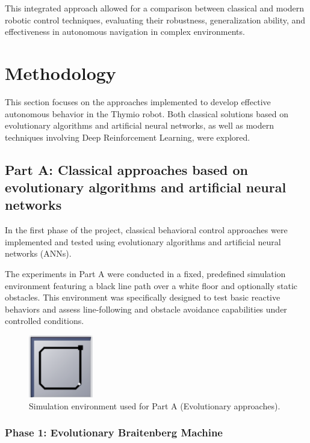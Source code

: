 \documentclass[final,5p,times,twocolumn,authoryear]{elsarticle}
\begin{document}
This integrated approach allowed for a comparison between classical and modern robotic control techniques, evaluating their robustness, generalization ability, and effectiveness in autonomous navigation in complex environments.

\section{Methodology}

This section focuses on the approaches implemented to develop effective autonomous behavior in the Thymio robot. Both classical solutions based on evolutionary algorithms and artificial neural networks, as well as modern techniques involving Deep Reinforcement Learning, were explored.



\subsection{\textbf{Part A: Classical approaches based on evolutionary algorithms and artificial neural networks}}

In the first phase of the project, classical behavioral control approaches were implemented and tested using evolutionary algorithms and artificial neural networks (ANNs).

The experiments in Part A were conducted in a fixed, predefined simulation environment featuring a black line path over a white floor and optionally static obstacles. This environment was specifically designed to test basic reactive behaviors and assess line-following and obstacle avoidance capabilities under controlled conditions.

\begin{figure}[H]
    \centering
    \includegraphics[width=0.25\textwidth]{figures/env1.png}
    \caption{Simulation environment used for Part A (Evolutionary approaches).}
    \label{fig:env1}
\end{figure}

\subsubsection{Phase 1: Evolutionary Braitenberg Machine}
\end{document}
